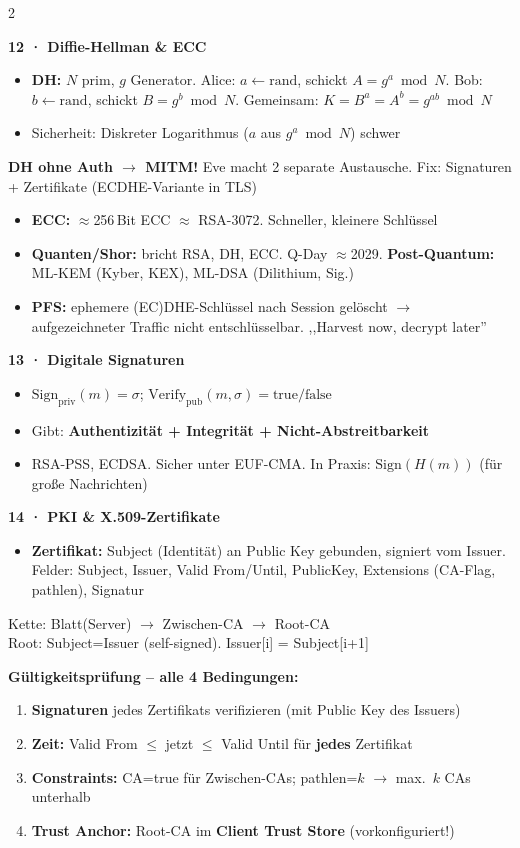 \documentclass[11pt,a4paper]{article}
\newcommand{\h}[1]{%
  \vspace{3pt}%
  \noindent\colorbox{hdr2}{%
    \parbox{\dimexpr\linewidth-2\fboxsep}{\color{white}\bfseries #1}}%
  \par\vspace{1pt}%
}
\newenvironment{wbox}{\begin{mdframed}[style=warnS]}{\end{mdframed}}
\newenvironment{tbox}{\begin{mdframed}[style=treeS]\ttfamily\small}{\end{mdframed}}
\begin{document}
\begin{multicols}{2}
\h{12 · Diffie-Hellman \& ECC}
\begin{itemize}
\item \textbf{DH:} $N$ prim, $g$ Generator.
  Alice: $a\leftarrow\mathrm{rand}$, schickt $A=g^a\!\bmod N$.
  Bob: $b\leftarrow\mathrm{rand}$, schickt $B=g^b\!\bmod N$.
  Gemeinsam: $K=B^a=A^b=g^{ab}\!\bmod N$
\item Sicherheit: Diskreter Logarithmus ($a$ aus $g^a\bmod N$) schwer
\end{itemize}
\begin{wbox}
\textbf{DH ohne Auth $\to$ MITM!} Eve macht 2 separate Austausche.
Fix: Signaturen + Zertifikate (ECDHE-Variante in TLS)
\end{wbox}
\begin{itemize}
\item \textbf{ECC:} $\approx$256\,Bit ECC $\approx$ RSA-3072.
  Schneller, kleinere Schlüssel
\item \textbf{Quanten/Shor:} bricht RSA, DH, ECC.
  Q-Day $\approx$2029. \textbf{Post-Quantum:}
  ML-KEM (Kyber, KEX), ML-DSA (Dilithium, Sig.)
\item \textbf{PFS:} ephemere (EC)DHE-Schlüssel nach Session gelöscht
  $\to$ aufgezeichneter Traffic nicht entschlüsselbar.
  ,,Harvest now, decrypt later''
\end{itemize}

\h{13 · Digitale Signaturen}
\begin{itemize}
\item $\mathrm{Sign}_{\mathrm{priv}}(m)=\sigma$;\;
  $\mathrm{Verify}_{\mathrm{pub}}(m,\sigma)=\mathrm{true/false}$
\item Gibt: \textbf{Authentizität + Integrität + Nicht-Abstreitbarkeit}
\item RSA-PSS, ECDSA. Sicher unter EUF-CMA.
  In Praxis: $\mathrm{Sign}(H(m))$ (für große Nachrichten)
\end{itemize}

\h{14 · PKI \& X.509-Zertifikate}
\begin{itemize}
\item \textbf{Zertifikat:} Subject (Identität) an Public Key gebunden,
  signiert vom Issuer.
  Felder: Subject, Issuer, Valid From/Until, PublicKey,
  Extensions (CA-Flag, pathlen), Signatur
\end{itemize}
\begin{tbox}
Kette: Blatt(Server) $\to$ Zwischen-CA $\to$ Root-CA\\
Root: Subject=Issuer (self-signed). Issuer[i] = Subject[i+1]
\end{tbox}
\textbf{Gültigkeitsprüfung -- alle 4 Bedingungen:}
\begin{enumerate}
\item \textbf{Signaturen} jedes Zertifikats verifizieren
  (mit Public Key des Issuers)
\item \textbf{Zeit:} Valid From $\le$ jetzt $\le$ Valid Until für
  \textbf{jedes} Zertifikat
\item \textbf{Constraints:} CA=true für Zwischen-CAs;
  pathlen=$k$ $\to$ max.\ $k$ CAs unterhalb
\item \textbf{Trust Anchor:} Root-CA im \textbf{Client Trust Store}
  (vorkonfiguriert!)
\end{enumerate}


\end{multicols}
\end{document}
